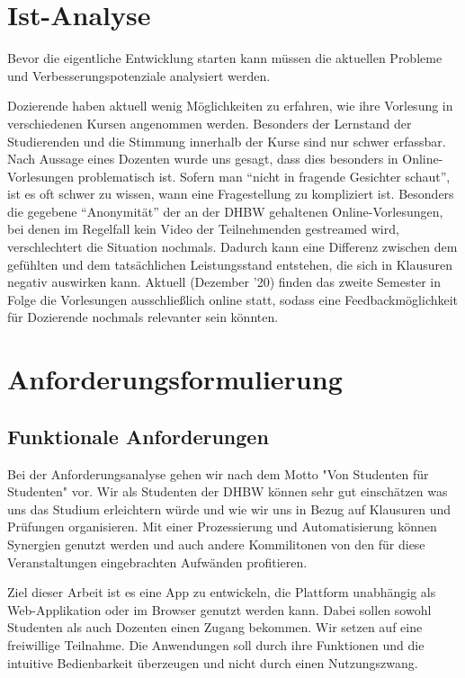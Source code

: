 

\section{Ist-Analyse}
Bevor die eigentliche Entwicklung starten kann müssen die aktuellen Probleme und Verbesserungspotenziale analysiert werden.

Dozierende haben aktuell wenig Möglichkeiten zu erfahren, wie ihre Vorlesung in verschiedenen Kursen angenommen werden.
Besonders der Lernstand der Studierenden und die Stimmung innerhalb der Kurse sind nur schwer erfassbar.
Nach Aussage eines Dozenten wurde uns gesagt, dass dies besonders in Online-Vorlesungen problematisch ist.
Sofern man \enquote{nicht in fragende Gesichter schaut}, ist es oft schwer zu wissen, wann eine Fragestellung zu kompliziert ist.
Besonders die gegebene \enquote{Anonymität} der an der DHBW gehaltenen Online-Vorlesungen, bei denen im Regelfall kein Video der Teilnehmenden gestreamed wird, verschlechtert die Situation nochmals.
Dadurch kann eine Differenz zwischen dem gefühlten und dem tatsächlichen Leistungsstand entstehen, die sich in Klausuren negativ auswirken kann.
Aktuell (Dezember '20) finden das zweite Semester in Folge die Vorlesungen ausschließlich online statt, sodass eine Feedbackmöglichkeit für Dozierende nochmals relevanter sein könnten.

\section{Anforderungsformulierung}

\subsection{Funktionale Anforderungen} 
Bei der Anforderungsanalyse gehen wir nach dem Motto "Von Studenten für Studenten" vor. Wir als Studenten der DHBW können sehr gut einschätzen was uns das Studium erleichtern würde und wie wir uns in Bezug auf Klausuren und Prüfungen organisieren. Mit einer Prozessierung und Automatisierung können Synergien genutzt werden und auch andere Kommilitonen von den für diese Veranstaltungen eingebrachten Aufwänden profitieren.

Ziel dieser Arbeit ist es eine App zu entwickeln, die Plattform unabhängig als Web-Applikation oder im Browser genutzt werden kann.
Dabei sollen sowohl Studenten als auch Dozenten einen Zugang bekommen.
Wir setzen auf eine freiwillige Teilnahme. Die Anwendungen soll durch ihre Funktionen und die intuitive Bedienbarkeit überzeugen und nicht durch einen Nutzungszwang.

